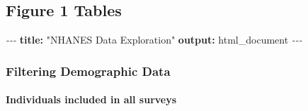 \documentclass[
]{article}
\author{}
\date{\vspace{-2.5em}}
\newenvironment{Shaded}{\begin{snugshade}}{\end{snugshade}}
\newcommand{\AttributeTok}[1]{\textcolor[rgb]{0.13,0.29,0.53}{#1}}
\newcommand{\FunctionTok}[1]{\textcolor[rgb]{0.13,0.29,0.53}{\textbf{#1}}}
\newcommand{\KeywordTok}[1]{\textcolor[rgb]{0.13,0.29,0.53}{\textbf{#1}}}
\newcommand{\PreprocessorTok}[1]{\textcolor[rgb]{0.56,0.35,0.01}{\textit{#1}}}
\newcommand{\StringTok}[1]{\textcolor[rgb]{0.31,0.60,0.02}{#1}}
\begin{document}
\subsection{Figure 1 Tables}\label{figure-1-tables}

\begin{Shaded}
\begin{Highlighting}[]
\PreprocessorTok{{-}{-}{-}}
\FunctionTok{title}\KeywordTok{:}\AttributeTok{ }\StringTok{"NHANES Data Exploration"}
\FunctionTok{output}\KeywordTok{:}\AttributeTok{ html\_document}
\PreprocessorTok{{-}{-}{-}}
\end{Highlighting}
\end{Shaded}

\subsubsection{Filtering Demographic
Data}\label{filtering-demographic-data}

\paragraph{Individuals included in all
surveys}\label{individuals-included-in-all-surveys}
\end{document}
